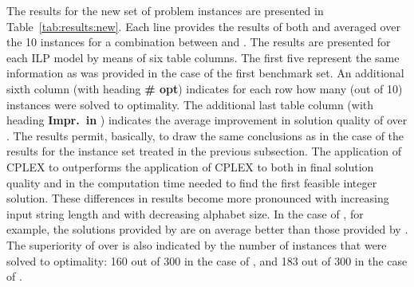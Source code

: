 \documentclass[11pt,a4paper]{article}
\begin{document}
The results for the new set of problem instances are presented in
Table~\ref{tab:results:new}. Each line provides the results of both
 and  averaged over the 10 instances for a
combination between  and . The results are presented for
each ILP model by means of six table columns. The first five represent the
same information as was provided in the case of the first benchmark set.
An additional sixth column (with heading {\bf \# opt}) indicates for
each row how many (out of 10) instances were solved to optimality.
The additional last table column (with heading {\bf Impr.~in })
indicates the average improvement in solution quality of  over
. The results permit, basically, to draw the same conclusions
as in the case of the results for the instance set treated in the
previous subsection. The application of CPLEX to  outperforms
the application of CPLEX to  both in final solution quality
and in the computation time needed to find the first feasible integer
solution. These differences in results become more pronounced with
increasing input string length and with decreasing alphabet size. In the
case of , for example, the solutions provided by 
are on average  better than those provided by . The
superiority of  over  is also indicated by the number
of instances that were solved to optimality: 160 out of 300 in the case
of , and 183 out of 300 in the case of .
\end{document}
